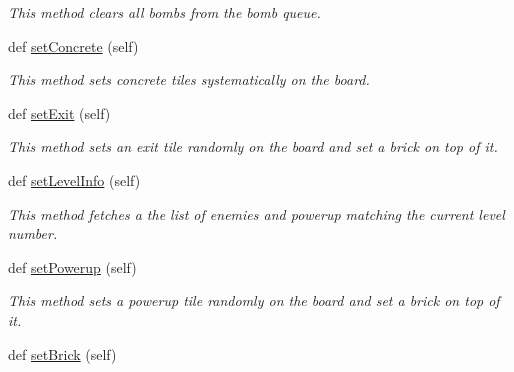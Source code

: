 \begin{DoxyCompactItemize}
\begin{DoxyCompactList}\small\item\em This method clears all bombs from the bomb queue. \end{DoxyCompactList}\item 
\hypertarget{classsrc_1_1level_1_1_level_ad43e3dab276d7ea38b268f22827b0236}{}def \hyperlink{classsrc_1_1level_1_1_level_ad43e3dab276d7ea38b268f22827b0236}{set\+Concrete} (self)\label{classsrc_1_1level_1_1_level_ad43e3dab276d7ea38b268f22827b0236}

\begin{DoxyCompactList}\small\item\em This method sets concrete tiles systematically on the board. \end{DoxyCompactList}\item 
\hypertarget{classsrc_1_1level_1_1_level_a37d135e2fd7961eb5f2921447d1c8243}{}def \hyperlink{classsrc_1_1level_1_1_level_a37d135e2fd7961eb5f2921447d1c8243}{set\+Exit} (self)\label{classsrc_1_1level_1_1_level_a37d135e2fd7961eb5f2921447d1c8243}

\begin{DoxyCompactList}\small\item\em This method sets an exit tile randomly on the board and set a brick on top of it. \end{DoxyCompactList}\item 
\hypertarget{classsrc_1_1level_1_1_level_a6e5e52649e074784152f5fe8f94ded08}{}def \hyperlink{classsrc_1_1level_1_1_level_a6e5e52649e074784152f5fe8f94ded08}{set\+Level\+Info} (self)\label{classsrc_1_1level_1_1_level_a6e5e52649e074784152f5fe8f94ded08}

\begin{DoxyCompactList}\small\item\em This method fetches a the list of enemies and powerup matching the current level number. \end{DoxyCompactList}\item 
\hypertarget{classsrc_1_1level_1_1_level_a7ab32312eb682ecce07ae83551c051e1}{}def \hyperlink{classsrc_1_1level_1_1_level_a7ab32312eb682ecce07ae83551c051e1}{set\+Powerup} (self)\label{classsrc_1_1level_1_1_level_a7ab32312eb682ecce07ae83551c051e1}

\begin{DoxyCompactList}\small\item\em This method sets a powerup tile randomly on the board and set a brick on top of it. \end{DoxyCompactList}\item 
\hypertarget{classsrc_1_1level_1_1_level_ae430589f114a19e13c2667e8ef37e266}{}def \hyperlink{classsrc_1_1level_1_1_level_ae430589f114a19e13c2667e8ef37e266}{set\+Brick} (self)\label{classsrc_1_1level_1_1_level_ae430589f114a19e13c2667e8ef37e266}


\end{DoxyCompactItemize}
